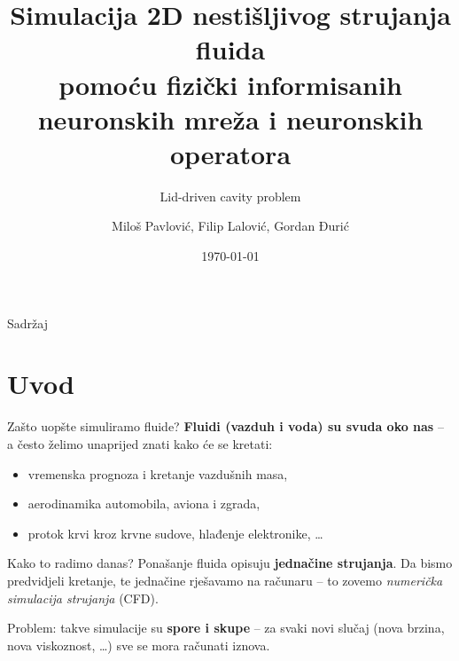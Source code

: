 \documentclass[10pt,aspectratio=169]{beamer}
\title[PINN i neuronski operatori za strujanje fluida]{Simulacija 2D nestišljivog strujanja fluida\\ pomoću fizički informisanih neuronskih mreža i neuronskih operatora}
\subtitle{Lid-driven cavity problem}
\author{Miloš Pavlović, Filip Lalović, Gordan Đurić}
\institute[]{Projekat iz mašinskog učenja}
\date{\today}
\begin{document}
\begin{frame}
  \titlepage
\end{frame}

\begin{frame}{Sadržaj}
  \tableofcontents
\end{frame}

\section{Uvod}

\begin{frame}{Zašto uopšte simuliramo fluide?}
  \textbf{Fluidi (vazduh i voda) su svuda oko nas} -- a često želimo unaprijed znati kako će se kretati:
  \vfill
  \begin{itemize}
    \item vremenska prognoza i kretanje vazdušnih masa,
    \item aerodinamika automobila, aviona i zgrada,
    \item protok krvi kroz krvne sudove, hlađenje elektronike, \ldots
  \end{itemize}
  \vfill
  \begin{block}{Kako to radimo danas?}
    Ponašanje fluida opisuju \textbf{jednačine strujanja}. Da bismo predvidjeli kretanje,
    te jednačine rješavamo na računaru -- to zovemo \emph{numerička simulacija strujanja} (CFD).
  \end{block}
  \vfill
  \alert{Problem:} takve simulacije su \textbf{spore i skupe} -- za svaki novi slučaj
  (nova brzina, nova viskoznost, \ldots) sve se mora računati iznova.
\end{frame}
\end{document}
